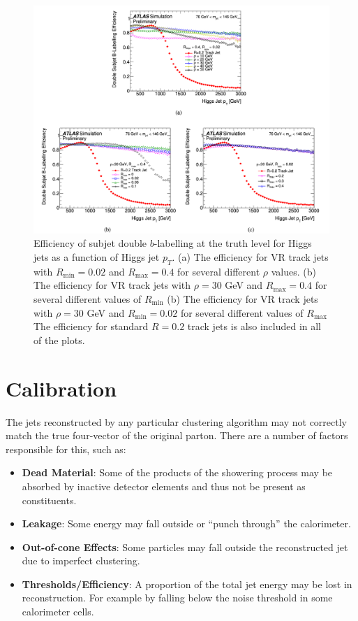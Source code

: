 \begin{figure}
	\centering
	\includegraphics[width=\textwidth]{vr_jet_optimization}
	\caption{
	Efficiency of subjet double $b$-labelling at the truth level for Higgs jets as a function of Higgs jet $p_T$.
	(a) The efficiency for VR track jets with $R_{\mathrm{min}} = 0.02$ and $R_{\mathrm{max}} = 0.4$ for several different $\rho$ values.
	(b) The efficiency for VR track jets with $\rho = 30$ GeV and $R_{\mathrm{max}} = 0.4$ for several different values of $R_{\mathrm{min}}$
	(b) The efficiency for VR track jets with $\rho = 30$ GeV and $R_{\mathrm{min}} = 0.02$ for several different values of $R_{\mathrm{max}}$
	The efficiency for standard $R = 0.2$ track jets is also included in all of the plots.
	}
	\label{fig:vr_jet_optimization}
\end{figure}

\section{Calibration}
\label{sec:jet_calibration}
The jets reconstructed by any particular clustering algorithm may not correctly match the true four-vector of the original parton.
There are a number of factors responsible for this, such as:
\begin{itemize}
    \itemsep0em 
    \item \textbf{Dead Material}: Some of the products of the showering process may be absorbed by inactive detector elements and thus not be present as constituents.
    \item \textbf{Leakage}: Some energy may fall outside or ``punch through'' the calorimeter.
    \item \textbf{Out-of-cone Effects}: Some particles may fall outside the reconstructed jet due to imperfect clustering.
    \item \textbf{Thresholds/Efficiency}: A proportion of the total jet energy may be lost in reconstruction. For example by falling below the noise threshold in some calorimeter cells.
\end{itemize}

